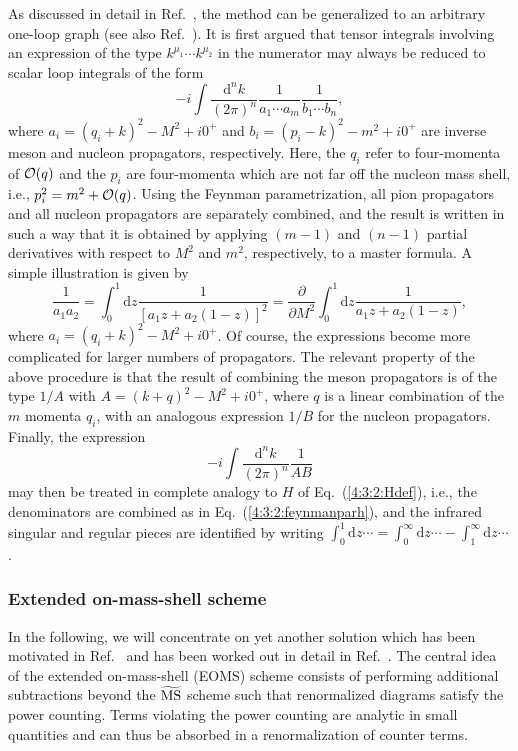 \documentclass[twoside,12pt]{article}
\begin{document}
   As discussed in detail in Ref.\ \cite{Becher:1999he}, the method can
be generalized to an arbitrary one-loop graph (see also Ref.\ \cite{Semke:2005sn}).
   It is first argued that tensor integrals involving
an expression of the type $k^{\mu_1}\cdots k^{\mu_2}$ in the numerator
may always be reduced to scalar loop integrals of the form
\begin{displaymath}
-i\int\frac{\mbox{d}^n k}{(2\pi)^n}\frac{1}{a_1\cdots a_m}\frac{1}{b_1\cdots b_n},
\end{displaymath}
where $a_i=(q_i+k)^2-M^2+i0^+$ and $b_i=(p_i-k)^2-m^2+i0^+$ are
inverse meson and nucleon propagators, respectively.
   Here, the $q_i$ refer to four-momenta of ${\cal O}(q)$ and the $p_i$ are
four-momenta which are not far off the nucleon mass shell, i.e.,
$p_i^2=m^2+{\cal O}(q)$.
    Using the Feynman parametrization, all pion propagators and all nucleon
propagators are separately combined, and the result is written in such
a way that it is obtained by applying $(m-1)$ and $(n-1)$ partial derivatives
with respect to $M^2$ and $m^2$, respectively, to a master formula.
   A simple illustration is given by
\begin{displaymath}
\frac{1}{a_1 a_2}=\int_0^1 \mbox{d}z \frac{1}{[a_1 z+a_2(1-z)]^2}
=\frac{\partial}{\partial M^2}\int_0^1 \mbox{d}z \frac{1}{a_1 z+a_2 (1-z)},
\end{displaymath}
where $a_i=(q_i+k)^2-M^2+i0^+$.
   Of course, the expressions become more complicated for larger numbers
of propagators.
   The relevant property of the above procedure is that the result of
combining the meson propagators is of the type $1/A$ with
$A=(k+q)^2-M^2+i0^+$, where $q$ is a linear combination of the $m$ momenta
$q_i$, with an analogous expression $1/B$ for the nucleon propagators.
   Finally, the expression
\begin{displaymath}
-i\int\frac{\mbox{d}^n k}{(2\pi)^n}\frac{1}{AB}
\end{displaymath}
may then be treated in complete analogy to $H$ of Eq.\ (\ref{4:3:2:Hdef}),
i.e., the denominators are combined as in Eq.\ (\ref{4:3:2:feynmanparh}),
and the infrared singular and regular pieces are identified by
writing $\int_0^1 \mbox{d}z\cdots
= \int_0^\infty \mbox{d}z \cdots-\int_1^\infty \mbox{d}z \cdots$.

\subsubsection{Extended on-mass-shell scheme}
   In the following, we will concentrate on yet another solution which
has been motivated in Ref.\ \linebreak\cite{Gegelia:1999gf} and has been worked out in
detail in Ref.\ \cite{Fuchs:2003qc}.
   The central idea of the
extended on-mass-shell (EOMS) scheme
consists of performing additional subtractions beyond
the $\widetilde{\rm MS}$ scheme such that
renormalized diagrams satisfy the power counting.
   Terms violating the power counting are analytic in small
quantities and can thus be absorbed in a renormalization of
counter terms.
\end{document}
